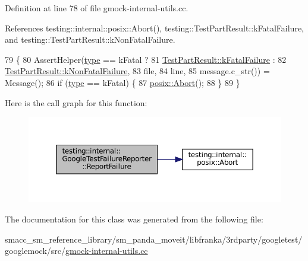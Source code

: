 Definition at line 78 of file gmock-\/internal-\/utils.\+cc.



References testing\+::internal\+::posix\+::\+Abort(), testing\+::\+Test\+Part\+Result\+::k\+Fatal\+Failure, and testing\+::\+Test\+Part\+Result\+::k\+Non\+Fatal\+Failure.


\begin{DoxyCode}
79                                                     \{
80     AssertHelper(\hyperlink{namespacegenerate__debs_a50bc9a7ecac9584553e089a448bcde58}{type} == kFatal ?
81                  \hyperlink{classtesting_1_1TestPartResult_a65ae656b33fdfdfffaf34858778a52d5ae1bf0b610b697a43fee97628cdab4ea1}{TestPartResult::kFatalFailure} :
82                  \hyperlink{classtesting_1_1TestPartResult_a65ae656b33fdfdfffaf34858778a52d5a00a755614f8ec3f78b2e951f8c91cd92}{TestPartResult::kNonFatalFailure},
83                  file,
84                  line,
85                  message.c\_str()) = Message();
86     \textcolor{keywordflow}{if} (\hyperlink{namespacegenerate__debs_a50bc9a7ecac9584553e089a448bcde58}{type} == kFatal) \{
87       \hyperlink{namespacetesting_1_1internal_1_1posix_a69b8278c59359dd6a6f941b4643db9fb}{posix::Abort}();
88     \}
89   \}
\end{DoxyCode}
Here is the call graph for this function\+:
\nopagebreak
\begin{figure}[H]
\begin{center}
\leavevmode
\includegraphics[width=350pt]{classtesting_1_1internal_1_1GoogleTestFailureReporter_a9b2f81e6c5b6e9f618fd75cc3e27e94c_cgraph}
\end{center}
\end{figure}


The documentation for this class was generated from the following file\+:\begin{DoxyCompactItemize}
\item 
smacc\+\_\+sm\+\_\+reference\+\_\+library/sm\+\_\+panda\+\_\+moveit/libfranka/3rdparty/googletest/googlemock/src/\hyperlink{gmock-internal-utils_8cc}{gmock-\/internal-\/utils.\+cc}\end{DoxyCompactItemize}
